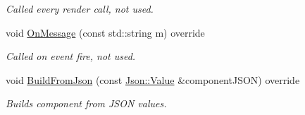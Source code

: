 \begin{DoxyCompactItemize}
\begin{DoxyCompactList}\small\item\em Called every render call, not used. \end{DoxyCompactList}\item 
\hypertarget{class_camera_component_a1cd7e6036568be5bf45d249d8f96a596}{void \hyperlink{class_camera_component_a1cd7e6036568be5bf45d249d8f96a596}{On\+Message} (const std\+::string m) override}\label{class_camera_component_a1cd7e6036568be5bf45d249d8f96a596}

\begin{DoxyCompactList}\small\item\em Called on event fire, not used. \end{DoxyCompactList}\item 
\hypertarget{class_camera_component_ae356a12312239d399984ac5b5aaa7adf}{void \hyperlink{class_camera_component_ae356a12312239d399984ac5b5aaa7adf}{Build\+From\+Json} (const \hyperlink{class_json_1_1_value}{Json\+::\+Value} \&component\+J\+S\+O\+N) override}\label{class_camera_component_ae356a12312239d399984ac5b5aaa7adf}

\begin{DoxyCompactList}\small\item\em Builds component from J\+S\+O\+N values. \end{DoxyCompactList}\end{DoxyCompactItemize}

